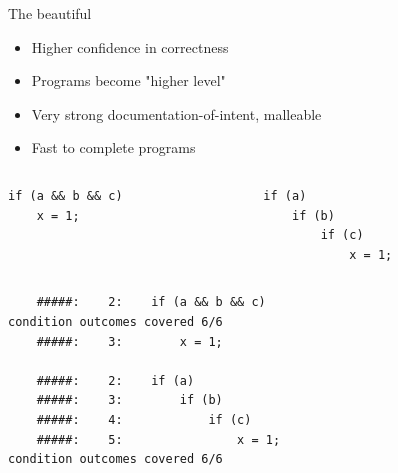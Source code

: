 \documentclass[xcolor = {dvipsnames, table}]{beamer}
\begin{document}
\begin{frame}
    \begin{block}{The beautiful}
        \begin{itemize}
            \item Higher confidence in correctness
            \item Programs become "higher level"
            \item Very strong documentation-of-intent, malleable
            \item Fast to complete programs
        \end{itemize}
    \end{block}
\end{frame}

\begin{frame}[fragile]
    \begin{columns}
        \begin{column}{0.5\textwidth}
            \centering
            \begin{lstlisting}
if (a && b && c)
    x = 1;
            \end{lstlisting}
        \end{column}

        \begin{column}{0.5\textwidth}
            \centering
            \begin{lstlisting}
if (a)
    if (b)
        if (c)
            x = 1;
            \end{lstlisting}
        \end{column}
    \end{columns}

    \centering
    \pause
    \begin{lstlisting}
    #####:    2:    if (a && b && c)
condition outcomes covered 6/6
    #####:    3:        x = 1;

    #####:    2:    if (a)
    #####:    3:        if (b)
    #####:    4:            if (c)
    #####:    5:                x = 1;
condition outcomes covered 6/6
    \end{lstlisting}
\end{frame}
\end{document}
